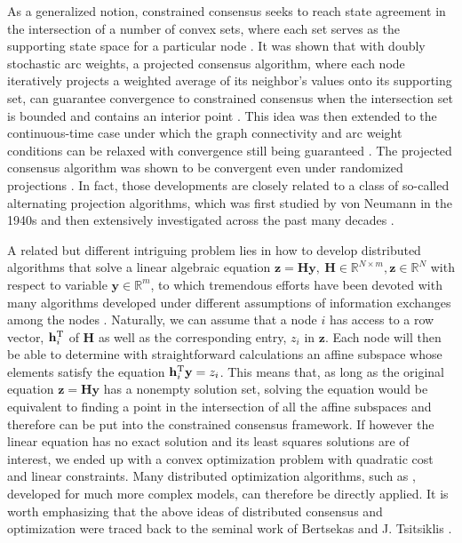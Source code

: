 \documentclass[a4paper, 11pt]{article}
\def\T{^{\rm\tiny T}}
\begin{document}
As a generalized  notion, constrained consensus seeks to reach state agreement  in the intersection of a number of convex sets, where each set serves  as the   supporting state space for a particular node \cite{nedic10}. It was shown that with doubly stochastic arc weights, a projected consensus algorithm,  where each node iteratively projects a weighted average of its neighbor's values onto its supporting set,  can guarantee convergence to constrained consensus when the intersection set is bounded and contains an interior point \cite{nedic10}. This idea was then extended to the continuous-time case under which the graph connectivity and arc weight conditions can be relaxed with convergence still being guaranteed \cite{shitac}. The projected consensus algorithm was shown to be convergent  even under randomized projections \cite{shiauto}.  In fact, those developments are closely related to a class of so-called alternating projection algorithms,  which was first studied by von Neumann in the 1940s \cite{jvn49} and then extensively investigated across the past many decades \cite{aron50, gubin1967,deut83,B-B-SIAM}.


A related but different   intriguing problem  lies in how to develop distributed algorithms that solve a linear algebraic equation $\mathbf{z}=\mathbf{H}\mathbf{y}, \ \mathbf{H}\in\mathbb{R}^{N\times m},\mathbf{z}\in\mathbb{R}^N $ with respect to variable $\mathbf{y}\in \mathbb{R}^m$, to which tremendous efforts have been devoted with many algorithms developed under different assumptions of information exchanges among the nodes \cite{anderson97, mehmood05, lu09-1,lu09-2,liu13,mou13,Morse-TAC15, asuman14, jadbabaie15, brian15}. Naturally, we can assume that a node $i$ has access to a row vector, $\mathbf{h}_i\T$  of $\mathbf{H}$ as well as the corresponding entry,  $z_i$ in $\mathbf{z}$. Each node will then be able to determine with straightforward calculations an affine subspace whose elements satisfy the equation $\mathbf{h}_i\T \mathbf{y}=z_i$. This means that, as long as the original equation $\mathbf{z}=\mathbf{H}\mathbf{y}$ has a nonempty solution set, solving the equation would be equivalent to finding a point in the intersection of all the affine subspaces and therefore  can be put into the constrained consensus framework. If however the linear equation has no exact solution and  its least squares solutions are of interest, we ended up with a convex optimization problem with quadratic cost and linear constraints. Many distributed optimization algorithms, such as \cite{nedic09,nedic10,elia,jmf,nedic11,Rabbat2012,lu12,cotes14,jakovetic14}, developed for much more complex models, can therefore be directly applied. It is worth emphasizing that the above ideas of distributed consensus and optimization were traced back to the seminal work of Bertsekas and J. Tsitsiklis \cite{tsi,tsibook}.
\end{document}
